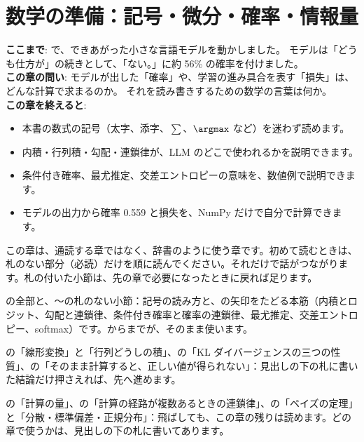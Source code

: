 \chapter{数学の準備：記号・微分・確率・情報量}\label{ch:math}

\begin{chapterlead}
\textbf{ここまで}: で、できあがった小さな言語モデルを動かしました。
モデルは「どうも仕方が」の続きとして、「ない。」に約 56\% の確率を付けました。\\[1mm]
\textbf{この章の問い}: モデルが出した「確率」や、学習の進み具合を表す「損失」は、どんな計算で求まるのか。
それを読み書きするための数学の言葉は何か。\\[1mm]
\textbf{この章を終えると}:
\begin{itemize}
\item 本書の数式の記号（太字、添字、$\sum$、$\argmax$ など）を迷わず読めます。
\item 内積・行列積・勾配・連鎖律が、LLM のどこで使われるかを説明できます。
\item 条件付き確率、最尤推定、交差エントロピーの意味を、数値例で説明できます。
\item モデルの出力から確率 0.559 と損失を、NumPy だけで自分で計算できます。
\end{itemize}
\end{chapterlead}

\begin{readingguide}
\item[\rgpre] この章は、通読する章ではなく、辞書のように使う章です。初めて読むときは、札のない部分（必読）だけを順に読んでください。それだけで話がつながります。札の付いた小節は、先の章で必要になったときに戻れば足ります。
\item[\rgmust] の全部と、〜の札のない小節：記号の読み方と、の矢印をたどる本筋（内積とロジット、勾配と連鎖律、条件付き確率と確率の連鎖律、最尤推定、交差エントロピー、softmax）です。からまでが、そのまま使います。
\item[\rgskim] の「線形変換」と「行列どうしの積」、の「KL ダイバージェンスの三つの性質」、の「そのまま計算すると、正しい値が得られない」：見出しの下の札に書いた結論だけ押さえれば、先へ進めます。
\item[\rglater] の「計算の量」、の「計算の経路が複数あるときの連鎖律」、の「ベイズの定理」と「分散・標準偏差・正規分布」：飛ばしても、この章の残りは読めます。どの章で使うかは、見出しの下の札に書いてあります。
\end{readingguide}
\suppressfloats[t]%

